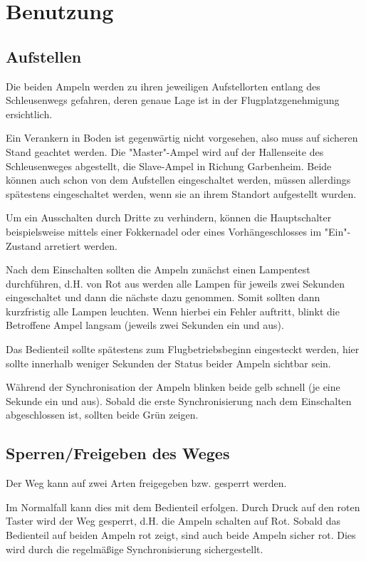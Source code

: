 \documentclass[a4paper, ngerman]{scrartcl}
\begin{document}
\section{Benutzung}
\subsection{Aufstellen}
Die beiden Ampeln werden zu ihren jeweiligen Aufstellorten entlang des Schleusenwegs gefahren, deren genaue Lage ist in der Flugplatzgenehmigung ersichtlich.

Ein Verankern in Boden ist gegenwärtig nicht vorgesehen, also muss auf sicheren Stand geachtet werden. Die "{}Master"{}-Ampel wird auf der Hallenseite des Schleusenweges abgestellt, die Slave-Ampel in Richung Garbenheim. Beide können auch schon von dem Aufstellen eingeschaltet werden, müssen allerdings spätestens eingeschaltet werden, wenn sie an ihrem Standort aufgestellt wurden.

Um ein Ausschalten durch Dritte zu verhindern, können die Hauptschalter beispielsweise mittels einer Fokkernadel oder eines Vorhängeschlosses im "{}Ein"{}-Zustand arretiert werden.

Nach dem Einschalten sollten die Ampeln zunächst einen Lampentest durchführen, d.H. von Rot aus werden alle Lampen für jeweils zwei Sekunden eingeschaltet und dann die nächste dazu genommen. Somit sollten dann kurzfristig alle Lampen leuchten. Wenn hierbei ein Fehler auftritt, blinkt die Betroffene Ampel langsam (jeweils zwei Sekunden ein und aus).

Das Bedienteil sollte spätestens zum Flugbetriebsbeginn eingesteckt werden, hier sollte innerhalb weniger Sekunden der Status beider Ampeln sichtbar sein.

Während der Synchronisation der Ampeln blinken beide gelb schnell (je eine Sekunde ein und aus). Sobald die erste Synchronisierung nach dem Einschalten abgeschlossen ist, sollten beide Grün zeigen.

\subsection{Sperren/Freigeben des Weges}
Der Weg kann auf zwei Arten freigegeben bzw. gesperrt werden.

Im Normalfall kann dies mit dem Bedienteil erfolgen. Durch Druck auf den roten Taster wird der Weg gesperrt, d.H. die Ampeln schalten auf Rot.  Sobald das Bedienteil auf beiden Ampeln rot zeigt, sind auch beide Ampeln sicher rot. Dies wird durch die regelmäßige Synchronisierung sichergestellt.
\end{document}

